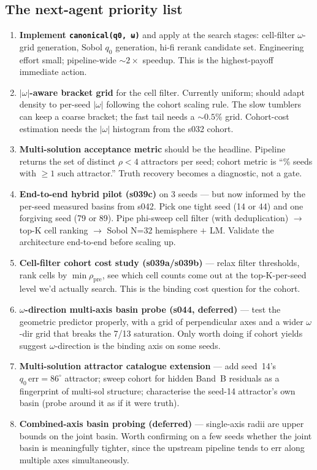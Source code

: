 \documentclass[11pt,a4paper]{article}
\begin{document}
\subsection{The next-agent priority list}

\begin{enumerate}
\item \textbf{Implement \texttt{canonical(q0, ω)}} and apply at the search stages: cell-filter $\omega$-grid generation, Sobol $q_0$ generation, hi-fi rerank candidate set. Engineering effort small; pipeline-wide $\sim 2\times$ speedup. This is the highest-payoff immediate action.

\item \textbf{$|\omega|$-aware bracket grid} for the cell filter. Currently uniform; should adapt density to per-seed $|\omega|$ following the cohort scaling rule. The slow tumblers can keep a coarse bracket; the fast tail needs a $\sim 0.5\%$ grid. Cohort-cost estimation needs the $|\omega|$ histogram from the s032 cohort.

\item \textbf{Multi-solution acceptance metric} should be the headline. Pipeline returns the set of distinct $\rho < 4$ attractors per seed; cohort metric is ``\% seeds with $\geq 1$ such attractor.'' Truth recovery becomes a diagnostic, not a gate.

\item \textbf{End-to-end hybrid pilot (s039c)} on 3 seeds --- but now informed by the per-seed measured basins from s042. Pick one tight seed (14 or 44) and one forgiving seed (79 or 89). Pipe phi-sweep cell filter (with deduplication) $\to$ top-K cell ranking $\to$ Sobol N=32 hemisphere $+$ LM. Validate the architecture end-to-end before scaling up.

\item \textbf{Cell-filter cohort cost study (s039a/s039b)} --- relax filter thresholds, rank cells by $\min \rho_{\mathrm{pre}}$, see which cell counts come out at the top-K-per-seed level we'd actually search. This is the binding cost question for the cohort.

\item \textbf{$\omega$-direction multi-axis basin probe (s044, deferred)} --- test the geometric predictor properly, with a grid of perpendicular axes and a wider $\omega$-dir grid that breaks the 7/13 saturation. Only worth doing if cohort yields suggest $\omega$-direction is the binding axis on some seeds.

\item \textbf{Multi-solution attractor catalogue extension} --- add seed~14's $q_0\,\mathrm{err}{=}86^\circ$ attractor; sweep cohort for hidden Band~B residuals as a fingerprint of multi-sol structure; characterise the seed-14 attractor's own basin (probe around it as if it were truth).

\item \textbf{Combined-axis basin probing (deferred)} --- single-axis radii are upper bounds on the joint basin. Worth confirming on a few seeds whether the joint basin is meaningfully tighter, since the upstream pipeline tends to err along multiple axes simultaneously.
\end{enumerate}
\end{document}
